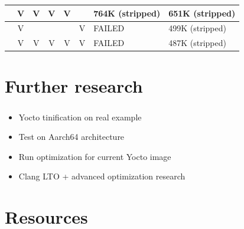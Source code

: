 \documentclass{beamer}
\begin{document}
\begin{frame}[fragile]
\begin{table}
{\begin{tabular}{|c|c|c|c|c|c|l|l|}
                                  & V                                    & V                                 & V                                    & V                              &                         & 764K (stripped)                                                                & 651K (stripped)                                                               \\ \hline
                                  & V                                    &                                   &                                      &                                & V                       & FAILED                                                                         & 499K (stripped)                                                               \\ \hline
                                  & V                                    & V                                 & V                                    & V                              & V                       & FAILED                                                                         & 487K (stripped) \\ \hline                                                              
\end{tabular}%
}
\end{table}
\end{frame}

\section{Further research}

\begin{frame}
\frametitle{\secname}
\begin{itemize}
    \item Yocto tinification on real example
    \item Test on Aarch64 architecture
    \item Run optimization for current Yocto image
    \item Clang LTO + advanced optimization research
\end{itemize}
\end{frame}

\section{Resources}
\end{document}
